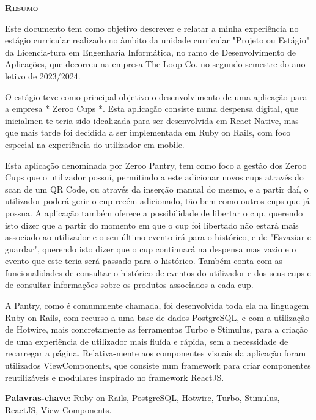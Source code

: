 
\vspace*{45pt}
\begin{flushleft}
	{\Large \textbf{\scshape{Resumo}}}
\end{flushleft}
\vspace*{10pt}


Este documento tem como objetivo descrever e relatar a minha experiência no estágio curricular realizado no âmbito da unidade curricular
"Projeto ou Estágio" da Licencia-tura em Engenharia Informática, no ramo de Desenvolvimento de Aplicações, que decorreu na empresa
The Loop Co. no segundo semestre do ano letivo de 2023/2024.

O estágio teve como principal objetivo o desenvolvimento de uma aplicação para a empresa * Zeroo Cups *. Esta aplicação consiste numa
despensa digital, que inicialmen-te teria sido idealizada para ser desenvolvida em React-Native, mas que mais tarde foi decidida a ser 
implementada em Ruby on Rails, com foco especial na experiência do utilizador em mobile.

Esta aplicação denominada por Zeroo Pantry, tem como foco a gestão dos Zeroo Cups que o utilizador possui, permitindo a este adicionar
novos cups através do scan de um QR Code, ou através da inserção manual do mesmo, e a partir daí, o utilizador poderá gerir o cup recém adicionado,
tão bem como outros cups que já possua. A aplicação também oferece a possibilidade de libertar o cup, querendo isto dizer que a partir do momento em que o cup foi libertado
não estará mais associado ao utilizador e o seu último evento irá para o histórico,
e de "Esvaziar e guardar", querendo isto dizer que o cup continuará na despensa mas vazio e o evento que este teria será passado para o histórico.
Também conta com as funcionalidades de consultar o histórico de eventos do utilizador e dos seus cups e de consultar informações sobre os produtos associados a cada cup.

A Pantry, como é comummente chamada, foi desenvolvida toda ela na linguagem Ruby on Rails, com recurso a uma base de dados PostgreSQL, e com a utilização de
Hotwire, mais concretamente as ferramentas Turbo e Stimulus, para a criação de uma experiência de utilizador mais fluída e rápida, sem a necessidade de recarregar a página.
Relativa-mente aos componentes visuais da aplicação foram utilizados ViewComponents, que consiste num framework para criar componentes reutilizáveis e modulares inspirado no framework ReactJS.


\vspace*{20pt}

\noindent \textbf{Palavras-chave}:
Ruby on Rails, PostgreSQL, Hotwire, Turbo, Stimulus, ReactJS, View-Components.

